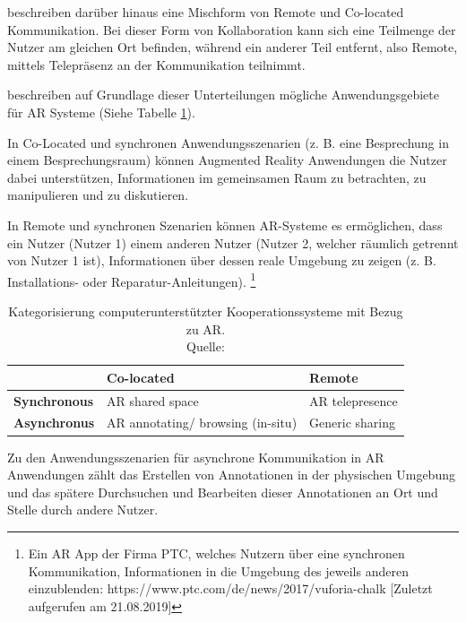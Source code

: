 \citeauthor{Marriott2018} beschreiben darüber hinaus eine Mischform von Remote und Co-located Kommunikation. 
Bei dieser Form von Kollaboration kann sich eine Teilmenge der Nutzer am gleichen Ort befinden, während ein anderer Teil entfernt, 
also Remote, mittels Telepräsenz an der Kommunikation teilnimmt.\cite[S.~188]{Marriott2018}

\citeauthor{DieterSchmalstieg2016} beschreiben auf Grundlage dieser Unterteilungen mögliche 
Anwendungsgebiete für AR Systeme (Siehe Tabelle \ref{tab:categorycscw}).\cite[S.~362]{DieterSchmalstieg2016}

In Co-Located und synchronen Anwendungsszenarien (z. B. eine Besprechung in einem Besprechungsraum) können 
Augmented Reality Anwendungen die Nutzer dabei unterstützen, Informationen im gemeinsamen Raum zu betrachten, zu manipulieren und zu diskutieren.\cite[S.~362]{DieterSchmalstieg2016}  

In Remote und synchronen Szenarien können AR-Systeme es ermöglichen, dass ein Nutzer (Nutzer 1) einem anderen Nutzer (Nutzer 2, welcher räumlich getrennt von Nutzer 1 ist), 
Informationen über dessen reale Umgebung zu zeigen (z. B. Installations- oder Reparatur-Anleitungen). \footnote{Ein AR App der Firma PTC, welches Nutzern über eine synchronen Kommunikation, Informationen in die Umgebung des jeweils anderen einzublenden: https://www.ptc.com/de/news/2017/vuforia-chalk [Zuletzt aufgerufen am 21.08.2019]} 

\begin{table}[htbp]
\caption{Kategorisierung computerunterstützter Kooperationssysteme mit Bezug zu AR. \\Quelle: \cite[S.~362]{DieterSchmalstieg2016}}
	\begin{center}
		\begin{tabular}{|l|ll|}
		\hline
		 & \textbf{Co-located} & \textbf{Remote}\\
		\hline
		\textbf{Synchronous} &  AR shared space & AR telepresence \\
		\textbf{Asynchronus} & AR annotating/ browsing (in-situ) & Generic sharing\\
		\hline
		\end{tabular}
	\end{center}
	\label{tab:categorycscw}
\end{table}

\cite[S.~362]{DieterSchmalstieg2016} Zu den Anwendungsszenarien für asynchrone Kommunikation in AR Anwendungen zählt das Erstellen von Annotationen in der 
physischen Umgebung und das spätere Durchsuchen und Bearbeiten dieser Annotationen an Ort und Stelle durch andere Nutzer.		


